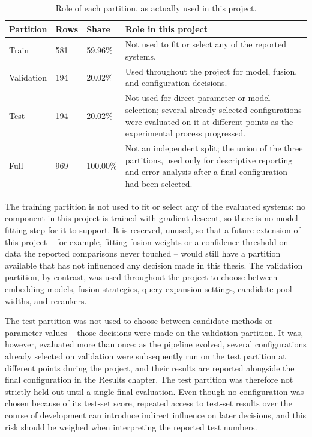 \begingroup
\footnotesize
\begin{table}[htbp]
\centering
\begin{tabular}{p{2.2cm}p{1.2cm}p{1.3cm}p{8.6cm}}
\toprule
\textbf{Partition} & \textbf{Rows} & \textbf{Share} & \textbf{Role in this project}\\
\midrule
Train & 581 & 59.96\% & Not used to fit or select any of the reported systems.\\
Validation & 194 & 20.02\% & Used throughout the project for model, fusion, and configuration decisions.\\
Test & 194 & 20.02\% & Not used for direct parameter or model selection; several already-selected configurations were evaluated on it at different points as the experimental process progressed.\\
Full & 969 & 100.00\% & Not an independent split; the union of the three partitions, used only for descriptive reporting and error analysis after a final configuration had been selected.\\
\bottomrule
\end{tabular}
\caption{Role of each partition, as actually used in this project.}
\label{tab:partitions}
\end{table}
\endgroup

The training partition is not used to fit or select any of the evaluated systems: no component in this project is trained with gradient descent, so there is no model-fitting step for it to support. It is reserved, unused, so that a future extension of this project -- for example, fitting fusion weights or a confidence threshold on data the reported comparisons never touched -- would still have a partition available that has not influenced any decision made in this thesis. The validation partition, by contrast, was used throughout the project to choose between embedding models, fusion strategies, query-expansion settings, candidate-pool widths, and rerankers.

The test partition was not used to choose between candidate methods or parameter values -- those decisions were made on the validation partition. It was, however, evaluated more than once: as the pipeline evolved, several configurations already selected on validation were subsequently run on the test partition at different points during the project, and their results are reported alongside the final configuration in the Results chapter. The test partition was therefore not strictly held out until a single final evaluation. Even though no configuration was chosen because of its test-set score, repeated access to test-set results over the course of development can introduce indirect influence on later decisions, and this risk should be weighed when interpreting the reported test numbers.
